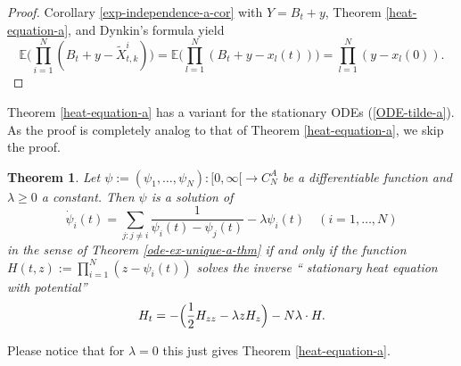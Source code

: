 \documentclass[reqno]{amsart}
\theoremstyle{plain}
\newtheorem{theorem}{Theorem}[section]
\theoremstyle{definition}
\numberwithin{equation}{section}
\begin{document}
\begin{proof} Corollary \ref{exp-independence-a-cor} with $Y=B_t+y$, Theorem \ref{heat-equation-a}, and Dynkin's formula yield
  $$\mathbb E\bigl(\prod_{i=1}^N (B_t+y- \tilde X_{t,k}^i)\bigr)=\mathbb E\bigl(\prod_{l=1}^N (B_t+y- x_l(t))\bigr) = \prod_{l=1}^N(y- x_l(0)).$$
\end{proof}



 
 Theorem \ref{heat-equation-a} has a variant for the stationary ODEs (\ref{ODE-tilde-a}).
 As the proof is completely analog to that of Theorem \ref{heat-equation-a}, we skip the proof.

\begin{theorem}\label{heat-equation-a-stat}
  Let $\psi:=(\psi_1,\ldots,\psi_N):[0,\infty[\to C_N^A$ be a differentiable function and $\lambda\ge0$ a constant.
      Then $\psi$ is a solution of
      \begin{equation}\label{ODE-tilde-a-gen}
\dot{\psi}_i(t) = \sum_{j: j\ne i}  \frac{1}{\psi_{i}(t)-\psi_{j}(t)}
-\lambda\psi_{i}(t)\quad(i=1,\ldots,N)
      \end{equation}
 in the sense of Theorem \ref{ode-ex-unique-a-thm}
      if and only if the function $H(t,z):=\prod_{i=1}^N (z-\psi_i(t))$
      solves the inverse `` stationary heat equation with potential''
      \begin{equation}\label{heateq-a-stationary}     H_t=  -\Bigl( \frac{1}{2}H_{zz} -\lambda z H_{z}\Bigr) -N\lambda\cdot H.
        \end{equation}
\end{theorem}

Please notice that for $\lambda=0$ this just gives Theorem \ref{heat-equation-a}.
\end{document}
